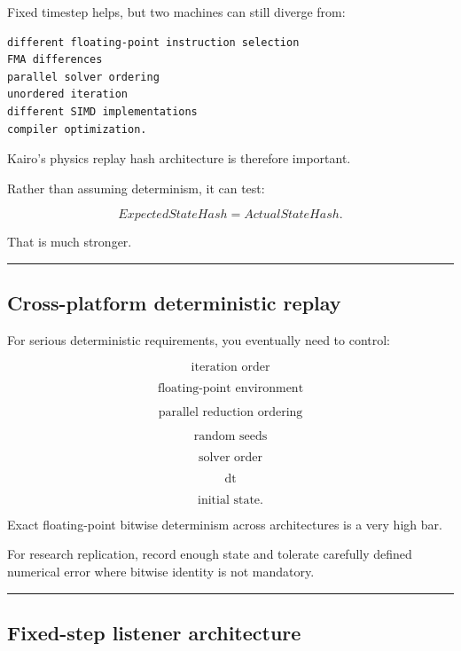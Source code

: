 Fixed timestep helps, but two machines can still diverge from:

\begin{verbatim}
different floating-point instruction selection
FMA differences
parallel solver ordering
unordered iteration
different SIMD implementations
compiler optimization.
\end{verbatim}

Kairo's physics replay hash architecture is therefore important.

Rather than assuming determinism, it can test:

\[
ExpectedStateHash
=
ActualStateHash.
\]

That is much stronger.

\begin{center}\rule{0.5\linewidth}{0.5pt}\end{center}

\subsection{Cross-platform deterministic replay}\label{06-engine-ii-ch037-cross-platform-deterministic-replay}

For serious deterministic requirements, you eventually need to control:

\[
\text{iteration order}
\]

\[
\text{floating-point environment}
\]

\[
\text{parallel reduction ordering}
\]

\[
\text{random seeds}
\]

\[
\text{solver order}
\]

\[
\text{dt}
\]

\[
\text{initial state}.
\]

Exact floating-point bitwise determinism across architectures is a very high bar.

For research replication, record enough state and tolerate carefully defined numerical error where bitwise identity is not mandatory.

\begin{center}\rule{0.5\linewidth}{0.5pt}\end{center}

\subsection{Fixed-step listener architecture}\label{06-engine-ii-ch037-fixed-step-listener-architecture}

